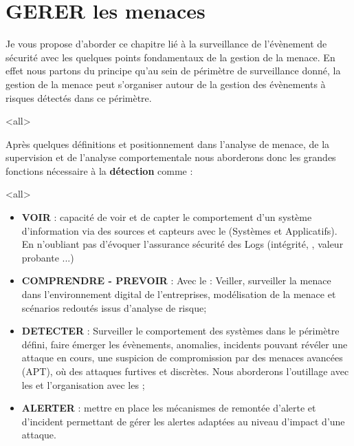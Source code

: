 

\section{GERER les menaces}

Je vous propose d'aborder ce chapitre lié à la surveillance de l'évènement de sécurité avec les quelques points fondamentaux de la gestion de la menace.
En effet nous partons du principe qu'au sein de périmètre de surveillance donné, la gestion de la menace peut s'organiser autour de la gestion des évènements à risques détectés dans ce périmètre.

\mode<all>{}

Après quelques définitions et positionnement dans l'analyse de menace,  de la supervision et de l'analyse comportementale nous aborderons donc les grandes fonctions nécessaire à la \textbf{détection} comme :

\mode<all>{
{
\begin{itemize}
  \item \textbf{VOIR} :  capacité de voir et de capter le comportement d'un système d'information via des sources et capteurs avec le \textit{} (Systèmes et Applicatifs). En n'oubliant pas d'évoquer l'assurance sécurité des Logs (intégrité, , valeur probante ...)
\item \textbf{COMPRENDRE - PREVOIR} : Avec le \textit{} : Veiller, surveiller la menace dans l'environnement digital de l'entreprises, modélisation de la menace et scénarios redoutés issus d'analyse de risque;
\item \textbf{DETECTER} : Surveiller le comportement des systèmes dans le périmètre défini, faire émerger les  évènements, anomalies, incidents pouvant révéler une attaque en cours, une suspicion de compromission par des menaces avancées (APT), où des attaques furtives et discrètes. Nous aborderons l'outillage avec les  et l'organisation avec les ;
\item \textbf{ALERTER} : mettre en place les mécanismes de remontée d'alerte et d'incident permettant de gérer les alertes adaptées au niveau d'impact d'une attaque. 
\end{itemize}
}}



